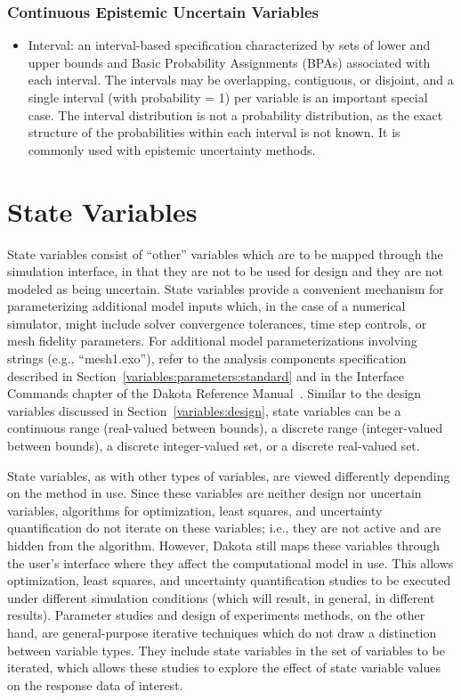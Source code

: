 \subsubsection{Continuous Epistemic Uncertain Variables}\label{variables:uncertain:ceuv}

\begin{itemize}

\item Interval: an interval-based specification characterized by sets of
  lower and upper bounds and Basic Probability Assignments (BPAs)
  associated with each interval.  The intervals may be overlapping,
  contiguous, or disjoint, and a single interval (with probability =
  1) per variable is an important special case.  The interval
  distribution is not a probability distribution, as the exact
  structure of the probabilities within each interval is not known.
  It is commonly used with epistemic uncertainty methods.

\end{itemize}

\section{State Variables}\label{variables:state}

State variables consist of ``other'' variables which are to be mapped
through the simulation interface, in that they are not to be used for
design and they are not modeled as being uncertain. State variables
provide a convenient mechanism for parameterizing additional model
inputs which, in the case of a numerical simulator, might include
solver convergence tolerances, time step controls, or mesh fidelity
parameters. For additional model parameterizations involving strings
(e.g., ``mesh1.exo''), refer to the analysis components specification
described in Section~\ref{variables:parameters:standard} and in the
Interface Commands chapter of the Dakota Reference
Manual~\cite{RefMan}.  Similar to the design variables discussed in
Section~\ref{variables:design}, state variables can be a continuous
range (real-valued between bounds), a discrete range (integer-valued
between bounds), a discrete integer-valued set, or a discrete
real-valued set.

State variables, as with other types of variables, are viewed
differently depending on the method in use. Since these variables are
neither design nor uncertain variables, algorithms for optimization,
least squares, and uncertainty quantification do not iterate on these
variables; i.e., they are not active and are hidden from the
algorithm. However, Dakota still maps these variables through the
user's interface where they affect the computational model in use.
This allows optimization, least squares, and uncertainty
quantification studies to be executed under different simulation
conditions (which will result, in general, in different results).
Parameter studies and design of experiments methods, on the other
hand, are general-purpose iterative techniques which do not draw a
distinction between variable types. They include state variables in
the set of variables to be iterated, which allows these studies to
explore the effect of state variable values on the response data of
interest.

